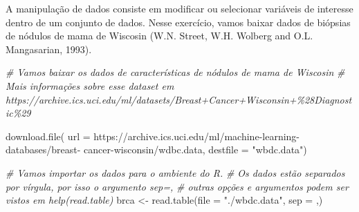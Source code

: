 \documentclass[
]{book}
\newenvironment{Shaded}{\begin{snugshade}}{\end{snugshade}}
\newcommand{\AttributeTok}[1]{\textcolor[rgb]{0.77,0.63,0.00}{#1}}
\newcommand{\CommentTok}[1]{\textcolor[rgb]{0.56,0.35,0.01}{\textit{#1}}}
\newcommand{\FunctionTok}[1]{\textcolor[rgb]{0.00,0.00,0.00}{#1}}
\newcommand{\NormalTok}[1]{#1}
\newcommand{\OtherTok}[1]{\textcolor[rgb]{0.56,0.35,0.01}{#1}}
\newcommand{\StringTok}[1]{\textcolor[rgb]{0.31,0.60,0.02}{#1}}
\begin{document}
A manipulação de dados consiste em modificar ou selecionar variáveis de interesse dentro de um conjunto de dados. Nesse exercício, vamos baixar dados de biópsias de nódulos de mama de Wiscosin (W.N. Street, W.H. Wolberg and O.L. Mangasarian, 1993).

\begin{Shaded}
\begin{Highlighting}[]
\CommentTok{\# Vamos baixar os dados de características de nódulos de mama de Wiscosin}
\CommentTok{\# Mais informações sobre esse dataset em https://archive.ics.uci.edu/ml/datasets/Breast+Cancer+Wisconsin+\%28Diagnostic\%29}

\FunctionTok{download.file}\NormalTok{(}
\AttributeTok{url =} \StringTok{\textquotesingle{}https://archive.ics.uci.edu/ml/machine{-}learning{-}databases/breast{-}}
\StringTok{cancer{-}wisconsin/wdbc.data\textquotesingle{}}\NormalTok{,}
\AttributeTok{destfile =} \StringTok{"wbdc.data"}\NormalTok{)}

\CommentTok{\# Vamos importar os dados para o ambiente do R.}
\CommentTok{\# Os dados estão separados por vírgula, por isso o argumento sep=\textquotesingle{},\textquotesingle{}}
\CommentTok{\# outras opções e argumentos podem ser vistos em help(read.table)}
\NormalTok{brca }\OtherTok{\textless{}{-}} \FunctionTok{read.table}\NormalTok{(}\AttributeTok{file =} \StringTok{"./wbdc.data"}\NormalTok{, }\AttributeTok{sep =} \StringTok{\textquotesingle{},\textquotesingle{}}\NormalTok{)}


\end{Highlighting}
\end{Shaded}
\end{document}

